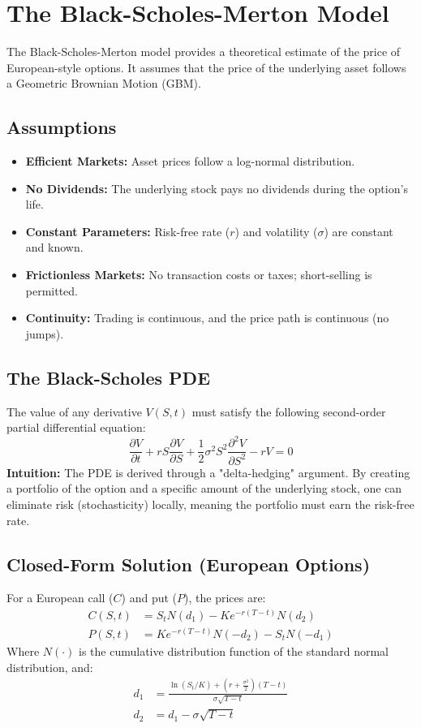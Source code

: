 
\section{The Black-Scholes-Merton Model}
The Black-Scholes-Merton model provides a theoretical estimate of the price of European-style options. It assumes that the price of the underlying asset follows a Geometric Brownian Motion (GBM).

\subsection{Assumptions}
\begin{itemize}
    \item \textbf{Efficient Markets:} Asset prices follow a log-normal distribution.
    \item \textbf{No Dividends:} The underlying stock pays no dividends during the option's life.
    \item \textbf{Constant Parameters:} Risk-free rate ($r$) and volatility ($\sigma$) are constant and known.
    \item \textbf{Frictionless Markets:} No transaction costs or taxes; short-selling is permitted.
    \item \textbf{Continuity:} Trading is continuous, and the price path is continuous (no jumps).
\end{itemize}

\subsection{The Black-Scholes PDE}
The value of any derivative $V(S,t)$ must satisfy the following second-order partial differential equation:
\begin{equation}
    \frac{\partial V}{\partial t} + rS \frac{\partial V}{\partial S} + \frac{1}{2}\sigma^2 S^2 \frac{\partial^2 V}{\partial S^2} - rV = 0
\end{equation}
\textbf{Intuition:} The PDE is derived through a "delta-hedging" argument. By creating a portfolio of the option and a specific amount of the underlying stock, one can eliminate risk (stochasticity) locally, meaning the portfolio must earn the risk-free rate.

\subsection{Closed-Form Solution (European Options)}
For a European call ($C$) and put ($P$), the prices are:
\begin{align}
    C(S, t) &= S_t N(d_1) - Ke^{-r(T-t)} N(d_2) \\
    P(S, t) &= Ke^{-r(T-t)} N(-d_2) - S_t N(-d_1)
\end{align}
Where $N(\cdot)$ is the cumulative distribution function of the standard normal distribution, and:
\begin{align}
    d_1 &= \frac{\ln(S_t/K) + (r + \frac{\sigma^2}{2})(T-t)}{\sigma\sqrt{T-t}} \\
    d_2 &= d_1 - \sigma\sqrt{T-t}
\end{align}

